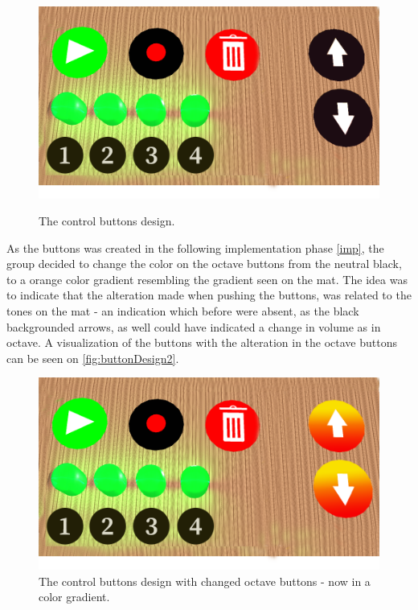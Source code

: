 \begin{figure}[H]
	\centering
	\includegraphics[width=0.7\linewidth]{figure/Design/buttonDesign}
	\label{fig:buttonDesign}
	\caption{The control buttons design.}	
\end{figure}


As the buttons was created in the following implementation phase \autoref{imp}, the group decided to change the color on the octave buttons from the neutral black, to a orange color gradient resembling the gradient seen on the mat. The idea was to indicate that the alteration made when pushing the buttons, was related to the tones on the mat - an indication which before were absent, as the black backgrounded arrows, as well could have indicated a change in volume as in octave. A visualization of the buttons with the alteration in the octave buttons can be seen on \autoref{fig:buttonDesign2}. 
\begin{figure}[H]
	\centering
	\includegraphics[width=0.7\linewidth]{figure/Design/buttonDesign2}
	\caption{The control buttons design with changed octave buttons - now in a color gradient.}	
	\label{fig:buttonDesign2}
\end{figure}


